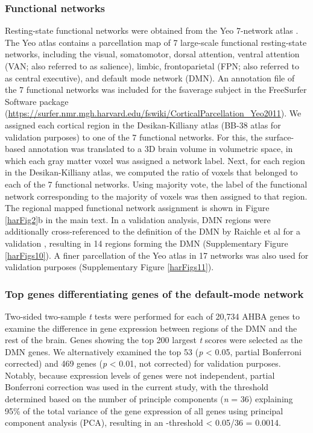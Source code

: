 \begin{refsection}
\subsubsection*{Functional networks}
Resting-state functional networks were obtained from the Yeo 7-network atlas \citep{thomas2011organization}. The Yeo atlas contains a parcellation map of 7 large-scale functional resting-state networks, including the visual, somatomotor, dorsal attention, ventral attention (VAN; also referred to as salience), limbic, frontoparietal (FPN; also referred to as central executive), and default mode network (DMN). An annotation file of the 7 functional networks was included for the fsaverage subject in the FreeSurfer Software package (\url{https://surfer.nmr.mgh.harvard.edu/fswiki/CorticalParcellation\_Yeo2011}). We assigned each cortical region in the Desikan-Killiany atlas \citep{CAMMOUN2012386,DESIKAN2006968} (BB-38 atlas for validation purposes) to one of the 7 functional networks. For this, the surface-based annotation was translated to a 3D brain volume in volumetric space, in which each gray matter voxel was assigned a network label. Next, for each region in the Desikan-Killiany atlas, we computed the ratio of voxels that belonged to each of the 7 functional networks. Using majority vote, the label of the functional network corresponding to the majority of voxels was then assigned to that region. The regional mapped functional network assignment is shown in Figure \ref{harFig2}b in the main text. In a validation analysis, DMN regions were additionally cross-referenced to the definition of the DMN by Raichle et al for a validation \citep{raichle2015brain}, resulting in 14 regions forming the DMN (Supplementary Figure \ref{harFigs10}). A finer parcellation of the Yeo atlas in 17 networks \citep{thomas2011organization} was also used for validation purposes (Supplementary Figure \ref{harFigs11}).

\subsubsection*{Top genes differentiating genes of the default-mode network}
Two-sided two-sample \textit{t} tests were performed for each of 20,734 AHBA genes to examine the difference in gene expression between regions of the DMN and the rest of the brain. Genes showing the top 200 largest \textit{t} scores were selected as the DMN genes. We alternatively examined the top 53 (\textit{p} < 0.05, partial Bonferroni corrected) and 469 genes (\textit{p} < 0.01, not corrected) for validation purposes. Notably, because expression levels of genes were not independent, partial Bonferroni correction \citep{Gao2008AMT,Li2005AdjustingMT,Shriner2008CommonalityOF} was used in the current study, with the threshold determined based on the number of principle components (\textit{n} = 36) explaining 95\%  of the total variance of the gene expression of all genes using principal component analysis (PCA), resulting in an \textit{\textalpha}-threshold < 0.05/36 = 0.0014.


\end{refsection}
